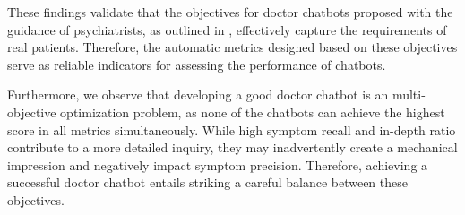 These findings validate that the objectives for doctor chatbots proposed with the guidance of psychiatrists, as outlined in , effectively capture the requirements of real patients. Therefore, the automatic metrics designed based on these objectives serve as reliable indicators for assessing the performance of chatbots.

\begin{table}[th]
    \small
    \centering
    \caption{Automatic evaluation scores of doctor chatbots}
    \label{tab:auto_doc}
\end{table}

Furthermore, we observe that developing a good doctor chatbot is an multi-objective optimization problem, as none of the chatbots can achieve the highest score in all metrics simultaneously.
While high symptom recall and in-depth ratio contribute to a more detailed inquiry, they may inadvertently create a mechanical impression and negatively impact symptom precision. Therefore, achieving a successful doctor chatbot entails striking a careful balance between these objectives.

